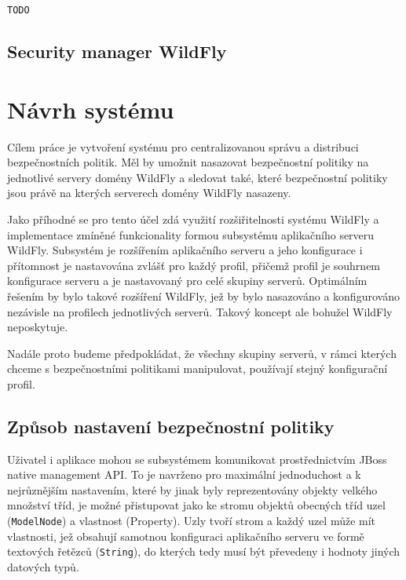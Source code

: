 {\tt TODO }



\section{Security manager WildFly}








\chapter{Návrh systému}

Cílem práce je vytvoření systému pro centralizovanou správu a distribuci bezpečnostních politik. Měl by umožnit nasazovat bezpečnostní politiky na jednotlivé servery domény WildFly a sledovat také, které bezpečnostní politiky jsou právě na kterých serverech domény WildFly nasazeny.

Jako příhodné se pro tento účel zdá využití rozšiřitelnosti systému WildFly a implementace zmíněné funkcionality formou subsystému aplikačního serveru WildFly. Subsystém je rozšířením aplikačního serveru a jeho konfigurace i přítomnost je nastavována zvlášť pro každý profil, přičemž profil je souhrnem konfigurace serveru a je nastavovaný pro celé skupiny serverů. Optimálním řešením by bylo takové rozšíření WildFly, jež by bylo nasazováno a konfigurováno nezávisle na profilech jednotlivých serverů. Takový koncept ale bohužel WildFly neposkytuje.

Nadále proto budeme předpokládat, že všechny skupiny serverů, v rámci kterých chceme s bezpečnostními politikami manipulovat, používají stejný konfigurační profil.

\section{Způsob nastavení bezpečnostní politiky}

Uživatel i aplikace mohou se subsystémem komunikovat prostřednictvím JBoss native management API. To je navrženo pro maximální jednoduchost a k nejrůznějším nastavením, které by jinak byly reprezentovány objekty velkého množství tříd, je možné přistupovat jako ke stromu objektů obecných tříd uzel ({\tt ModelNode}) a vlastnost (Property). Uzly tvoří strom a každý uzel může mít vlastnosti, jež obsahují samotnou konfiguraci aplikačního serveru ve formě textových řetězců ({\tt String}), do kterých tedy musí být převedeny i hodnoty jiných datových typů. \cite{jbossDetypedManagement}

